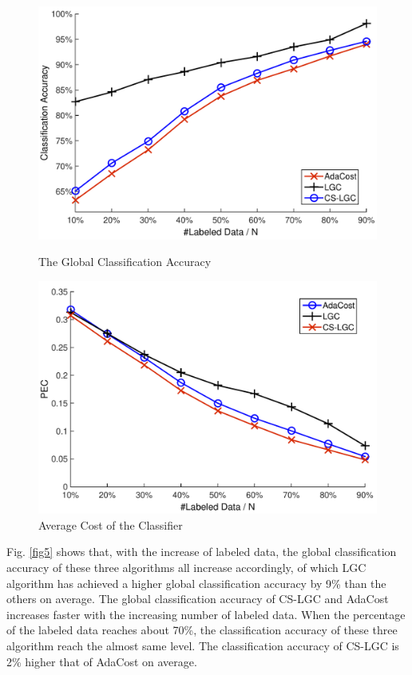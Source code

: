 \documentclass{svjour3}                     %
\begin{document}
\begin{figure}[H]
\begin{minipage}[t]{0.5\linewidth}
\includegraphics[width=\textwidth]{plot/fig5.pdf}
\caption{The Global Classification Accuracy} \label{fig5}
\end{minipage}
\begin{minipage}[t]{0.5\linewidth}
\includegraphics[width=\textwidth]{plot/fig6.pdf}
\caption{Average Cost of the Classifier} \label{fig6}
\end{minipage}
\end{figure}

Fig. \ref{fig5} shows that, with the increase of labeled data, the global classification accuracy of these three algorithms all increase accordingly, of which LGC algorithm has achieved a higher global classification accuracy by 9\% than the others on average. The global classification accuracy of CS-LGC and AdaCost increases faster with the increasing number of labeled data. When the percentage of the labeled data reaches about 70\%, the classification accuracy of these three algorithm reach the almost same level. The classification accuracy of CS-LGC is 2\% higher that of AdaCost on average.
\end{document}
